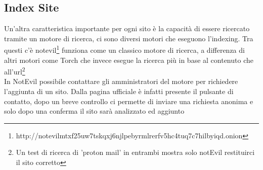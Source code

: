 \newpage

\subsection{Index Site}
Un'altra caratteristica importante per ogni sito è la capacità di essere ricercato tramite un motore di ricerca, ci sono diversi motori che eseguono l'indexing. Tra questi c'è notevil\footnote{http://notevilmtxf25uw7tskqxj6njlpebyrmlrerfv5hc4tuq7c7hilbyiqd.onion} funziona come un classico motore di ricerca, a differenza di altri motori come Torch che invece esegue la ricerca più in base al contenuto che all'url\footnote{Un test di ricerca di 'proton mail' in entrambi mostra solo notEvil restituirci il sito corretto} \\
In NotEvil possibile contattare gli amministratori del motore per richiedere l'aggiunta di un sito. Dalla pagina ufficiale è infatti presente il pulsante di contatto, dopo un breve controllo ci permette di inviare una richiesta anonima e solo dopo una conferma il sito sarà analizzato ed aggiunto
